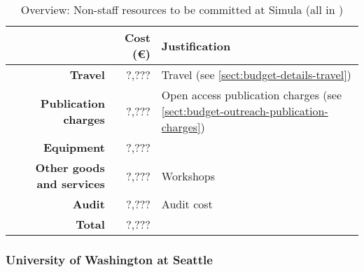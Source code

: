 \bigskip
\begin{table}[H]
\begin{tabular}{|r|r|p{9cm}|}
\hline
\textbf{} & \textbf{Cost (\euro)} & \textbf{Justification} \\\hline
\textbf{Travel} & ?,??? & Travel (see \ref{sect:budget-details-travel})\\\hline
\textbf{Publication charges} & ?,??? & Open access publication charges (see \ref{sect:budget-outreach-publication-charges})\\\hline
\textbf{Equipment} & ?,??? &  \\\hline    %

\textbf{Other goods and services} & ?,??? & Workshops \\\hline   %
\textbf{Audit} & ?,??? & Audit cost \\\hline
\textbf{Total} & ?,???\\\cline{1-2}
\end{tabular}
\caption{Overview: Non-staff resources to be committed at Simula (all in \texteuro)}\vspace*{-1em}
\end{table}




\subsubsection{University of Washington at Seattle}


